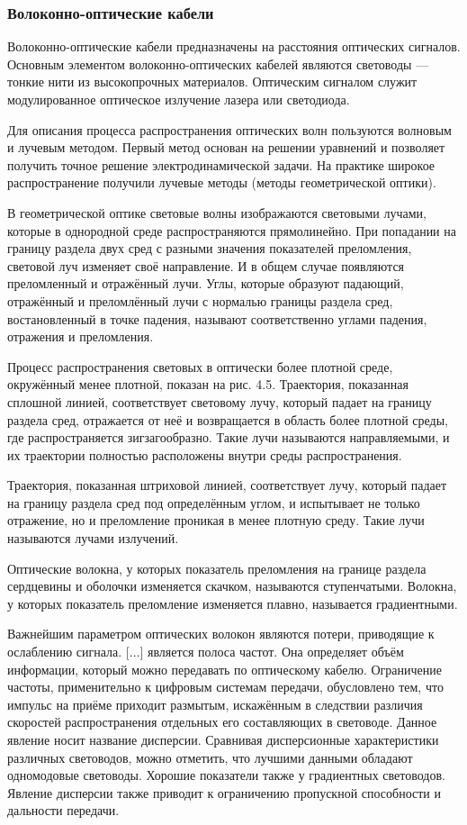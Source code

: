 \documentclass[
	a4paper,
	oneside,
	BCOR = 10mm,
	DIV = 12,
	12pt,
	headings = normal,
]{scrartcl}
\begin{document}
			\subsubsection{Волоконно-оптические кабели}
				Волоконно-оптические кабели предназначены на расстояния оптических сигналов. Основным элементом волоконно-оптических кабелей являются световоды — тонкие нити из высокопрочных материалов. Оптическим сигналом служит модулированное оптическое излучение лазера или светодиода.

				Для описания процесса распространения оптических волн пользуются волновым и лучевым методом. Первый метод основан на решении уравнений и позволяет получить точное решение электродинамической задачи. На практике широкое распространение получили лучевые методы (методы геометрической оптики).

				В геометрической оптике световые волны изображаются световыми лучами, которые в однородной среде распространяются прямолинейно. При попадании на границу раздела двух сред с разными значения показателей преломления, световой луч изменяет своё направление. И в общем случае появляются преломленный и отражённый лучи. Углы, которые образуют падающий, отражённый и преломлённый лучи с нормалью границы раздела сред, востановленный в точке падения, называют соответственно углами падения, отражения и преломления.

				Процесс распространения световых в оптически более плотной среде, окружённый менее плотной, показан на рис. 4.5. Траектория, показанная сплошной линией, соответствует световому лучу, который падает на границу раздела сред, отражается от неё и возвращается в область более плотной среды, где распространяется зигзагообразно. Такие лучи называются направляемыми, и их траектории полностью расположены внутри среды распространения.

				Траектория, показанная штриховой линией, соответствует лучу, который падает на границу раздела сред под определённым углом, и испытывает не только отражение, но и преломление проникая в менее плотную среду. Такие лучи называются лучами излучений. 

				Оптические волокна, у которых показатель преломления на границе раздела сердцевины и оболочки изменяется скачком, называются ступенчатыми. Волокна, у которых показатель преломление изменяется плавно, называется градиентными.

				Важнейшим параметром оптических волокон являются потери, приводящие к ослаблению сигнала. [...] является полоса частот. Она определяет объём информации, который можно передавать по оптическому кабелю. Ограничение частоты, применительно к цифровым системам передачи, обусловлено тем, что импульс на приёме приходит размытым, искажённым в следствии различия скоростей распространения отдельных его составляющих в световоде. Данное явление носит название дисперсии. Сравнивая дисперсионные характеристики различных световодов, можно отметить, что лучшими данными обладают одномодовые световоды. Хорошие показатели также у градиентных световодов. Явление дисперсии также приводит к ограничению пропускной способности и дальности передачи. 
\end{document}
